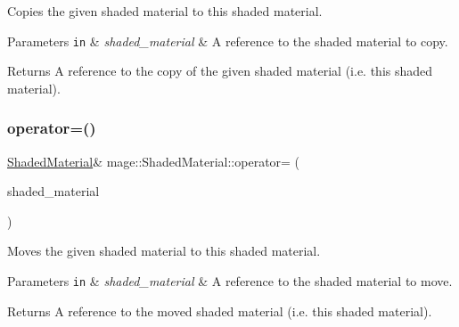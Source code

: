 Copies the given shaded material to this shaded material.


\begin{DoxyParams}[1]{Parameters}
\mbox{\tt in}  & {\em shaded\+\_\+material} & A reference to the shaded material to copy. \\
\hline
\end{DoxyParams}
\begin{DoxyReturn}{Returns}
A reference to the copy of the given shaded material (i.\+e. this shaded material). 
\end{DoxyReturn}
\hypertarget{structmage_1_1_shaded_material_a29fb482ab140fcb47709ffda03a67714}{}\label{structmage_1_1_shaded_material_a29fb482ab140fcb47709ffda03a67714} 
\subsubsection{\texorpdfstring{operator=()}{operator=()}\hspace{0.1cm}{\footnotesize\ttfamily [2/2]}}
{\footnotesize\ttfamily \hyperlink{structmage_1_1_shaded_material}{Shaded\+Material}\& mage\+::\+Shaded\+Material\+::operator= (\begin{DoxyParamCaption}\item[{\hyperlink{structmage_1_1_shaded_material}{Shaded\+Material} \&\&}]{shaded\+\_\+material }\end{DoxyParamCaption})\hspace{0.3cm}{\ttfamily [default]}}

Moves the given shaded material to this shaded material.


\begin{DoxyParams}[1]{Parameters}
\mbox{\tt in}  & {\em shaded\+\_\+material} & A reference to the shaded material to move. \\
\hline
\end{DoxyParams}
\begin{DoxyReturn}{Returns}
A reference to the moved shaded material (i.\+e. this shaded material). 
\end{DoxyReturn}
\hypertarget{structmage_1_1_shaded_material_a53336b2d98e414a73ad64f3176b5e996}{}\label{structmage_1_1_shaded_material_a53336b2d98e414a73ad64f3176b5e996} 
